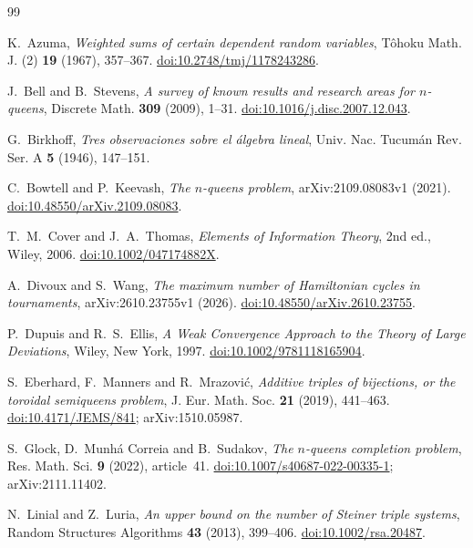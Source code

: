 \begin{thebibliography}{99}
\raggedright

 K.~Azuma, \emph{Weighted sums of certain dependent random variables},
T\^ohoku Math. J. (2) \textbf{19} (1967), 357--367.
\href{https://doi.org/10.2748/tmj/1178243286}{doi:10.2748/tmj/1178243286}.

 J.~Bell and B.~Stevens, \emph{A survey of known results and research areas for
$n$-queens}, Discrete Math. \textbf{309} (2009), 1--31.
\href{https://doi.org/10.1016/j.disc.2007.12.043}{doi:10.1016/j.disc.2007.12.043}.

 G.~Birkhoff, \emph{Tres observaciones sobre el álgebra lineal},
Univ. Nac. Tucumán Rev. Ser. A \textbf{5} (1946), 147--151.

 C.~Bowtell and P.~Keevash, \emph{The $n$-queens problem}, arXiv:2109.08083v1 (2021).
\href{https://doi.org/10.48550/arXiv.2109.08083}{doi:10.48550/arXiv.2109.08083}.

 T.~M.~Cover and J.~A.~Thomas, \emph{Elements of Information Theory}, 2nd ed., Wiley,
2006. \href{https://doi.org/10.1002/047174882X}{doi:10.1002/047174882X}.

 A.~Divoux and S.~Wang, \emph{The maximum number of Hamiltonian cycles in tournaments},
arXiv:2610.23755v1 (2026).
\href{https://doi.org/10.48550/arXiv.2610.23755}{doi:10.48550/arXiv.2610.23755}.

 P.~Dupuis and R.~S.~Ellis, \emph{A Weak Convergence Approach to the Theory of Large
Deviations}, Wiley, New York, 1997.
\href{https://doi.org/10.1002/9781118165904}{doi:10.1002/9781118165904}.

 S.~Eberhard, F.~Manners and R.~Mrazović, \emph{Additive triples of bijections, or the
toroidal semiqueens problem}, J. Eur. Math. Soc. \textbf{21} (2019), 441--463.
\href{https://doi.org/10.4171/JEMS/841}{doi:10.4171/JEMS/841}; arXiv:1510.05987.

 S.~Glock, D.~Munhá Correia and B.~Sudakov, \emph{The $n$-queens completion problem},
Res. Math. Sci. \textbf{9} (2022), article~41.
\href{https://doi.org/10.1007/s40687-022-00335-1}{doi:10.1007/s40687-022-00335-1};
arXiv:2111.11402.

 N.~Linial and Z.~Luria, \emph{An upper bound on the number of Steiner triple
systems}, Random Structures Algorithms \textbf{43} (2013), 399--406.
\href{https://doi.org/10.1002/rsa.20487}{doi:10.1002/rsa.20487}.


\end{thebibliography}
